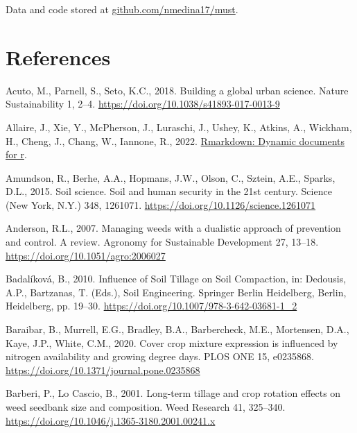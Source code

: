 \documentclass[
  12pt,
]{article}
\newlength{\cslhangindent}
\newlength{\cslentryspacingunit} %
\newenvironment{CSLReferences}[2] %
 {%
  \setlength{\parindent}{0pt}
  \ifodd #1
  \let\oldpar\par
  \def\par{\hangindent=\cslhangindent\oldpar}
  \fi
  \setlength{\parskip}{#2\cslentryspacingunit}
 }%
 {}
\begin{document}
Data and code stored at \href{github.com/nmedin17/must}{github.com/nmedina17/must}.

\newpage

\hypertarget{references}{%
\section*{References}\label{references}}

\hypertarget{refs}{}
\begin{CSLReferences}{1}{0}
\leavevmode{}%
Acuto, M., Parnell, S., Seto, K.C., 2018. Building a global urban science. Nature Sustainability 1, 2--4. \url{https://doi.org/10.1038/s41893-017-0013-9}

\leavevmode{}%
Allaire, J., Xie, Y., McPherson, J., Luraschi, J., Ushey, K., Atkins, A., Wickham, H., Cheng, J., Chang, W., Iannone, R., 2022. \href{https://github.com/rstudio/rmarkdown}{Rmarkdown: Dynamic documents for r}.

\leavevmode{}%
Amundson, R., Berhe, A.A., Hopmans, J.W., Olson, C., Sztein, A.E., Sparks, D.L., 2015. Soil science. {Soil} and human security in the 21st century. Science (New York, N.Y.) 348, 1261071. \url{https://doi.org/10.1126/science.1261071}

\leavevmode{}%
Anderson, R.L., 2007. Managing weeds with a dualistic approach of prevention and control. {A} review. Agronomy for Sustainable Development 27, 13--18. \url{https://doi.org/10.1051/agro:2006027}

\leavevmode{}%
Badalíková, B., 2010. Influence of {Soil Tillage} on {Soil Compaction}, in: Dedousis, A.P., Bartzanas, T. (Eds.), Soil {Engineering}. {Springer Berlin Heidelberg}, {Berlin, Heidelberg}, pp. 19--30. \url{https://doi.org/10.1007/978-3-642-03681-1_2}

\leavevmode{}%
Baraibar, B., Murrell, E.G., Bradley, B.A., Barbercheck, M.E., Mortensen, D.A., Kaye, J.P., White, C.M., 2020. Cover crop mixture expression is influenced by nitrogen availability and growing degree days. PLOS ONE 15, e0235868. \url{https://doi.org/10.1371/journal.pone.0235868}

\leavevmode{}%
Barberi, P., Lo Cascio, B., 2001. Long-term tillage and crop rotation effects on weed seedbank size and composition. Weed Research 41, 325--340. \url{https://doi.org/10.1046/j.1365-3180.2001.00241.x}


\end{CSLReferences}
\end{document}
